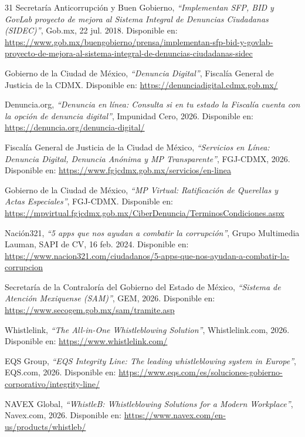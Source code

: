 \begin{thebibliography}{31}
Secretaría Anticorrupción y Buen Gobierno, \textit{``Implementan SFP, BID y GovLab proyecto de mejora al Sistema Integral de Denuncias Ciudadanas (SIDEC)''}, Gob.mx, 22 jul. 2018. Disponible en: \url{https://www.gob.mx/buengobierno/prensa/implementan-sfp-bid-y-govlab-proyecto-de-mejora-al-sistema-integral-de-denuncias-ciudadanas-sidec}

Gobierno de la Ciudad de México, \textit{``Denuncia Digital''}, Fiscalía General de Justicia de la CDMX. Disponible en: \url{https://denunciadigital.cdmx.gob.mx/}

Denuncia.org, \textit{``Denuncia en línea: Consulta si en tu estado la Fiscalía cuenta con la opción de denuncia digital''}, Impunidad Cero, 2026. Disponible en: \url{https://denuncia.org/denuncia-digital/}

Fiscalía General de Justicia de la Ciudad de México, \textit{``Servicios en Línea: Denuncia Digital, Denuncia Anónima y MP Transparente''}, FGJ-CDMX, 2026. Disponible en: \url{https://www.fgjcdmx.gob.mx/servicios/en-linea}

Gobierno de la Ciudad de México, \textit{``MP Virtual: Ratificación de Querellas y Actas Especiales''}, FGJ-CDMX. Disponible en: \url{https://mpvirtual.fgjcdmx.gob.mx/CiberDenuncia/TerminosCondiciones.aspx}

Nación321, \textit{``5 apps que nos ayudan a combatir la corrupción''}, Grupo Multimedia Lauman, SAPI de CV, 16 feb. 2024. Disponible en: \url{https://www.nacion321.com/ciudadanos/5-apps-que-nos-ayudan-a-combatir-la-corrupcion}

Secretaría de la Contraloría del Gobierno del Estado de México, \textit{``Sistema de Atención Mexiquense (SAM)''}, GEM, 2026. Disponible en: \url{https://www.secogem.gob.mx/sam/tramite.asp}

Whistlelink, \textit{``The All-in-One Whistleblowing Solution''}, Whistlelink.com, 2026. Disponible en: \url{https://www.whistlelink.com/}

EQS Group, \textit{``EQS Integrity Line: The leading whistleblowing system in Europe''}, EQS.com, 2026. Disponible en: \url{https://www.eqs.com/es/soluciones-gobierno-corporativo/integrity-line/}

NAVEX Global, \textit{``WhistleB: Whistleblowing Solutions for a Modern Workplace''}, Navex.com, 2026. Disponible en: \url{https://www.navex.com/en-us/products/whistleb/}


\end{thebibliography}
